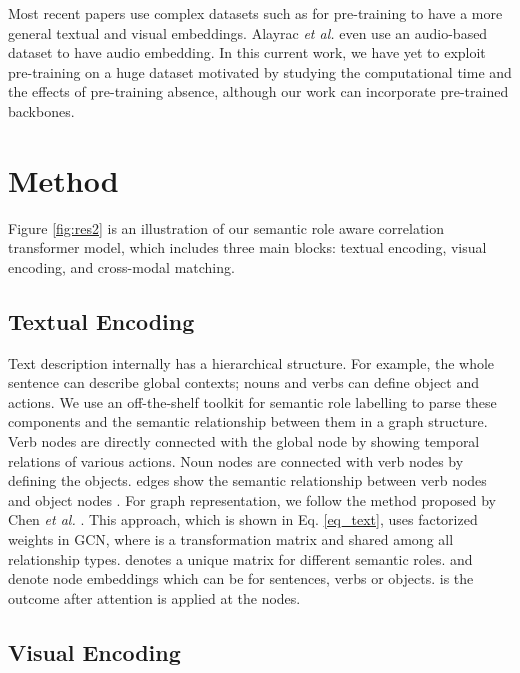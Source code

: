 \documentclass{article}
\begin{document}
Most recent papers \cite{miech18learning, gabeur2020mmt} use complex datasets such as \cite{miech19howto100m} for pre-training to have a more general textual and visual embeddings. Alayrac \textit{et al.} \cite{alayrac2020selfsupervised} even use an audio-based dataset \cite{audioset} to have audio embedding.  In this current work, we have yet to exploit pre-training on a huge dataset motivated by studying the computational time and the effects of pre-training absence, although our work can incorporate pre-trained backbones.


\section{Method}
\label{sec:method}

Figure \ref{fig:res2} is an illustration of our semantic role aware correlation transformer model, which includes three main blocks: textual encoding, visual encoding, and cross-modal matching.

\subsection{Textual Encoding}
\label{sec:methodtext}

Text description internally has a hierarchical structure. For example, the whole sentence can describe global contexts; nouns and verbs can define object and actions. We use an off-the-shelf toolkit \cite{shi2019simple} for semantic role labelling to parse these components and the semantic relationship between them in a graph structure. Verb nodes are directly connected with the global node by showing temporal relations of various actions. Noun nodes are connected with verb nodes by defining the objects.  edges show the semantic relationship between verb nodes  and object nodes . For graph representation, we follow the method proposed by Chen \textit{et al.} \cite{Chen_2020_CVPR}. This approach, which is shown in Eq. \ref{eq_text}, uses factorized weights in GCN, where  is a transformation matrix and shared among all relationship types.  denotes a unique matrix for different semantic roles.  and  denote node embeddings which can be for sentences, verbs or objects.  is the outcome after attention is applied at the nodes. 



\subsection{Visual Encoding}
\label{sec:methodvisual}
\end{document}
